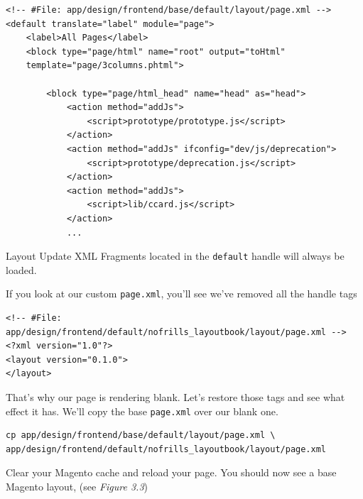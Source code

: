 \documentclass[oneside]{book}
\begin{document}
\begin{lstlisting}
<!-- #File: app/design/frontend/base/default/layout/page.xml -->
<default translate="label" module="page">
    <label>All Pages</label>
    <block type="page/html" name="root" output="toHtml"
    template="page/3columns.phtml">

        <block type="page/html_head" name="head" as="head">           
            <action method="addJs">
                <script>prototype/prototype.js</script>
            </action>
            <action method="addJs" ifconfig="dev/js/deprecation">
                <script>prototype/deprecation.js</script>
            </action>
            <action method="addJs">
                <script>lib/ccard.js</script>
            </action>
            ...

\end{lstlisting}


Layout Update XML Fragments located in the \footnotesize\texttt{default} \normalsize  handle will always be loaded.  

If you look at our custom \footnotesize\texttt{page.xml}\normalsize, you'll see we've removed all the handle tags

\begin{lstlisting}
<!-- #File: app/design/frontend/default/nofrills_layoutbook/layout/page.xml -->
<?xml version="1.0"?>
<layout version="0.1.0">
</layout>

\end{lstlisting}


That's why our page is rendering blank. Let's restore those tags and see what effect it has.  We'll copy the base \footnotesize\texttt{page.xml} \normalsize  over our blank one.  

\begin{lstlisting}
cp app/design/frontend/base/default/layout/page.xml \
app/design/frontend/default/nofrills_layoutbook/layout/page.xml

\end{lstlisting}


Clear your Magento cache and reload your page.  You should now see a base Magento layout, (see \emph{Figure 3.3})
\end{document}
